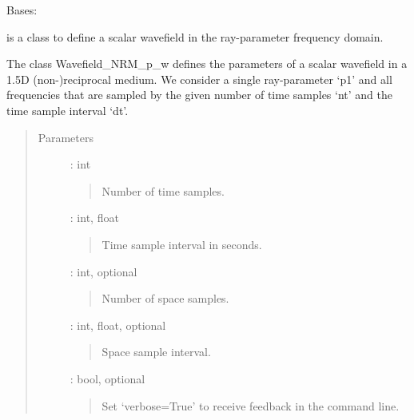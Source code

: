 \documentclass[letterpaper,10pt,english]{sphinxmanual}
\begin{document}
\begin{fulllineitems}
\label{\detokenize{Wavefield_NRM_p_w:Wavefield_NRM_p_w.Wavefield_NRM_p_w}}
Bases: %
\begin{footnote}[1]\sphinxAtStartFootnote
{}
%
\end{footnote}

is a class to define a scalar wavefield in the ray-parameter frequency domain.

The class Wavefield\_NRM\_p\_w defines the parameters of a scalar wavefield in a 1.5D (non-)reciprocal medium. We consider a single ray-parameter ‘p1’ and all frequencies that are sampled by the given number of time samples ‘nt’ and the time sample interval ‘dt’.
\begin{quote}\begin{description}
\item[{Parameters}] \leavevmode
{} : int
\begin{quote}

Number of time samples.
\end{quote}

 : int, float
\begin{quote}

Time sample interval in seconds.
\end{quote}

 : int, optional
\begin{quote}

Number of space samples.
\end{quote}

 : int, float, optional
\begin{quote}

Space sample interval.
\end{quote}

 : bool, optional
\begin{quote}

Set ‘verbose=True’ to receive feedback in the command line.
\end{quote}


\end{description}
\end{quote}
\end{fulllineitems}
\end{document}
